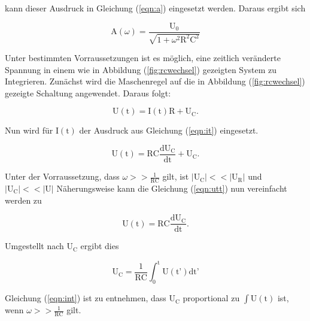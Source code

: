 \noindent
kann dieser Ausdruck in Gleichung (\ref{eqn:a}) eingesetzt werden. Daraus ergibt sich 

\begin{equation}
\text{A}(\omega) = \frac{\text{U}_0}{\sqrt{1 + \omega^2 \text{R}^2 \text{C}^2 }}
\end{equation}

\noindent
Unter bestimmten Vorraussetzungen ist es möglich, eine zeitlich veränderte Spannung in einem wie in Abbildung (\ref{fig:rcwechsel}) gezeigten System zu Integrieren.
Zunächst wird die Maschenregel auf die in Abbildung (\ref{fig:rcwechsel}) gezeigte Schaltung angewendet. Daraus folgt:

\begin{equation}
\text{U}(\text{t}) = \text{I}(\text{t})\text{R} + \text{U}_\text{C}.
\end{equation}

\noindent
Nun wird für $\text{I}(\text{t})$ der Ausdruck aus Gleichung (\ref{eqn:it}) eingesetzt.

\begin{equation}
\text{U}(\text{t}) = \text{RC} \frac{\text{dU}_\text{C}}{\text{dt}} + \text{U}_\text{C}.
\label{eqn:utt}
\end{equation}

\noindent
Unter der Vorraussetzung, dass $\omega >> \frac{1}{\text{RC}}$ gilt, ist $|\text{U}_\text{C}| << |\text{U}_\text{R}|$ und  $|\text{U}_\text{C}| << |\text{U}|$
Näherungsweise kann die Gleichung (\ref{eqn:utt}) nun vereinfacht werden zu

\begin{equation}
\text{U}(\text{t}) = \text{RC} \frac{\text{dU}_\text{C}}{\text{dt}}.
\end{equation}

\noindent
Umgestellt nach $\text{U}_\text{C}$ ergibt dies

\begin{equation}
\text{U}_\text{C} = \frac{1}{\text{RC}} \int_0^\text{t} \text{U}(\text{t'}) \text{dt'}
\label{eqn:int}
\end{equation}

\noindent
Gleichung (\ref{eqn:int}) ist zu entnehmen, dass $\text{U}_\text{C}$ proportional zu $\int \text{U}(\text{t})$ ist, wenn $\omega >> \frac{1}{\text{RC}}$ gilt.
